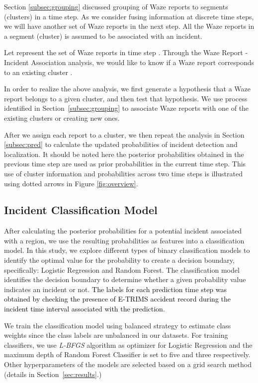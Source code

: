\documentclass[conference]{IEEEtran}
\begin{document}
Section \ref{subsec:grouping} discussed grouping of Waze reports to segments (clusters) in a time step. As we consider fusing information at discrete time steps, we will have another set of Waze reports in the next step. All the Waze reports in a segment (cluster) is assumed to be associated with an incident. 




Let  represent the set of Waze reports in time step . Through the Waze Report - Incident Association analysis, we would like to know if a Waze report  corresponds to an existing cluster .

In order to realize the above analysis, we first generate a hypothesis that a Waze report belongs to a given cluster, and then test that hypothesis.
We use process identified in Section~\ref{subsec:grouping} to associate Waze reports with one of the existing clusters or creating new ones. 

After we assign each report to a cluster, we then repeat the analysis in Section \ref{subsec:pred} to calculate the updated probabilities of incident detection and localization. It should be noted here the posterior probabilities obtained in the previous time step are used as prior probabilities in the current time step.  This use of cluster information and probabilities across two time steps is illustrated using dotted arrows in Figure \ref{fig:overview}.



\subsection{Incident Classification Model}
\label{subsec:pipeline}


After calculating the posterior probabilities for a potential incident associated with a region, we use the resulting probabilities as features into a classification model. 
In this study, we explore different types of binary classification models to identify the optimal value for the probability to create a decision boundary, specifically: Logistic Regression and Random Forest.  
The classification model identifies the decision boundary to determine whether a given probability value indicates an incident or not. \textcolor{black}{The labels for each prediction time step was obtained by checking the presence of E-TRIMS accident record during the incident time interval associated with the prediction.}

We train the classification model using balanced strategy to estimate class weights since the class labels are unbalanced in our datasets. 
For training classifiers, we use \textit{L-BFGS} algorithm as optimizer for Logistic Regression and the maximum depth of 
Random Forest Classifier is set to five and three respectively. Other hyperparameters of the models are selected based on a grid search method (details in Section~\ref{sec:results}.) 
\end{document}
